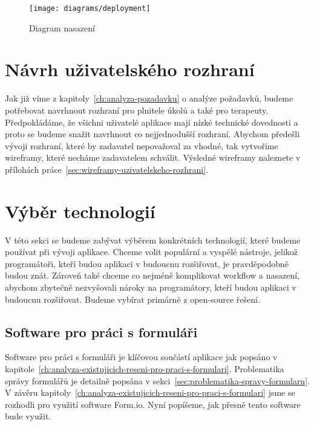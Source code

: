 \begin{figure}[H]
    \centering
    \texttt{[image: diagrams/deployment]}
    \caption{Diagram nasazení}\label{fig:deployment}
\end{figure}


\section{Návrh uživatelského rozhraní}\label{sec:navrh-uzivatelskeho-rozhrani}

Jak již víme z kapitoly~\ref{ch:analyza-pozadavku} o analýze požadavků, budeme potřebovat navrhnout rozhraní pro plnitele úkolů a také pro terapeuty.
Předpokládáme, že všichni uživatelé aplikace mají nízké technické dovednosti a proto se budeme snažit navrhnout co nejjednodušší rozhraní.
Abychom předešli vývoji rozhraní, které by zadavatel nepovažoval za vhodné, tak vytvoříme wireframy, které necháme zadavatelem schválit.
Výsledné wireframy naleznete v přílohách práce~\ref{sec:wireframy-uzivatelskeho-rozhrani}.


\section{Výběr technologií}\label{sec:vyber-technologii}

V této sekci se budeme zabývat výběrem konkrétních technologií, které budeme používat při vývoji aplikace.
Chceme volit populární a vyspělé nástroje, jelikož programátoři, kteří budou aplikaci v budoucnu rozšiřovat, je pravděpodobně budou znát.
Zároveň také chceme co nejméně komplikovat workflow a nasazení, abychom zbytečně nezvyšovali nároky na programátory, kteří budou aplikaci v budoucnu rozšiřovat.
Budeme vybírat primárně z open-source řešení.

\subsection{Software pro práci s formuláři}\label{subsec:software-pro-praci-s-formulari}

Software pro práci s formuláři je klíčovou součástí aplikace jak popsáno v kapitole~\ref{ch:analyza-existujicich-reseni-pro-praci-s-formulari}.
Problematika správy formulářů je detailně popsána v sekci~\ref{sec:problematika-spravy-formularu}.
V závěru kapitoly~\ref{ch:analyza-existujicich-reseni-pro-praci-s-formulari} jsme se rozhodli pro využití software Form.io.
Nyní popíšeme, jak přesně tento software bude využit.

